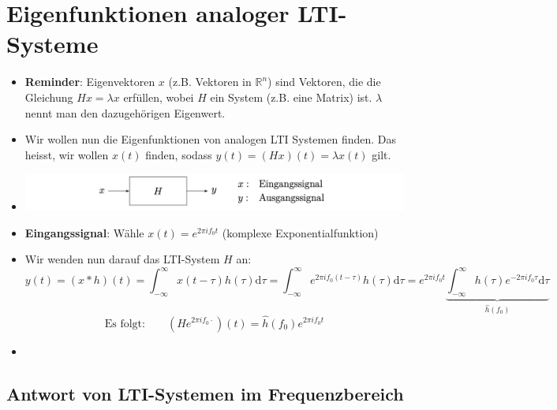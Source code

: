 \documentclass[11pt]{article}
\begin{document}
\section*{Eigenfunktionen analoger LTI-Systeme}
\vspace*{-0.5cm}
\begin{itemize}[leftmargin=0pt]
    \item[] \textbf{Reminder}: Eigenvektoren $x$ (z.B. Vektoren in $\mathbb{R}^n$) sind Vektoren, die die Gleichung $Hx = \lambda x$ erfüllen, wobei $H$ ein System (z.B. eine Matrix) ist. $\lambda$ nennt man den dazugehörigen Eigenwert.
    \item[] Wir wollen nun die Eigenfunktionen von analogen LTI Systemen finden. Das heisst, wir wollen $x(t)$ finden, sodass $y(t) = (Hx)(t) = \lambda x(t)$ gilt.
    \item[] \begin{center}
        \includegraphics[width=0.9\linewidth]{docimgs/System_Blockschaltbild.png}
    \end{center}
    \item[] \textbf{Eingangssignal}: Wähle $x(t)= e^{2\pi i f_0 t}$ (komplexe Exponentialfunktion)
    \item[] Wir wenden nun darauf das LTI-System $H$ an:
    $$y(t) = (x \ast h)(t) = \int_{-\infty}^\infty x(t-\tau)h(\tau) \text{d}\tau = \int_{-\infty}^\infty e^{2 \pi i f_0 (t-\tau)} h(\tau) \text{d}\tau = e^{2 \pi i f_0 t} \underbrace{\int_{-\infty}^\infty h(\tau) e^{-2\pi i f_0 \tau} \text{d}\tau}_{\hat{h}(f_0)} $$
    $$\text{Es folgt: } \hspace{20pt} (He^{2 \pi i f_0 \cdot})(t) = \hat{h}(f_0)e^{2 \pi i f_0 t}$$
    \item[] %
\end{itemize}

\vspace*{-0.5cm}
\subsection*{Antwort von LTI-Systemen im Frequenzbereich}
\vspace*{-0.5cm}
\end{document}
